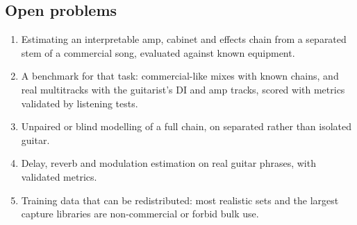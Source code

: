 \subsection{Open problems}

\begin{enumerate}
\item Estimating an interpretable amp, cabinet and effects chain from a separated
  stem of a commercial song, evaluated against known equipment.
\item A benchmark for that task: commercial-like mixes with known chains, and
  real multitracks with the guitarist's DI and amp tracks, scored with metrics
  validated by listening tests.
\item Unpaired or blind modelling of a full chain, on separated rather than
  isolated guitar.
\item Delay, reverb and modulation estimation on real guitar phrases, with
  validated metrics.
\item Training data that can be redistributed: most realistic sets and the
  largest capture libraries are non-commercial or forbid bulk use.
\end{enumerate}
